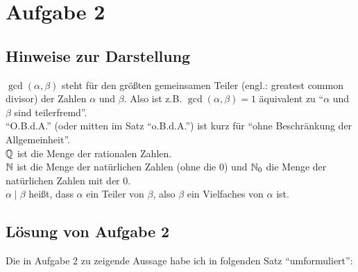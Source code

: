 \section{Aufgabe 2}

\subsection*{Hinweise zur Darstellung}

$\gcd(\alpha, \beta)$ steht für den größten gemeinsamen Teiler (engl.: greatest common divisor) der Zahlen $\alpha$ 
und $\beta$. Also ist z.B. $\gcd(\alpha, \beta) = 1$ äquivalent zu "`$\alpha$ und $\beta$ sind teilerfremd"'.\\
"`O.B.d.A."' (oder mitten im Satz "`o.B.d.A."') ist kurz für "`ohne Beschränkung der Allgemeinheit"'.\\
$\mathbb{Q}$ ist die Menge der rationalen Zahlen.\\
$\mathbb{N}$ ist die Menge der natürlichen Zahlen (ohne die 0) und $\mathbb{N}_0$ die Menge der natürlichen Zahlen mit der 0.\\
$\alpha \mid \beta$ heißt, dass $\alpha$ ein Teiler von $\beta$, also $\beta$ ein Vielfaches von $\alpha$ ist.

\subsection*{Lösung von Aufgabe 2}

Die in Aufgabe 2 zu zeigende Aussage habe ich in folgenden Satz "`umformuliert"':

